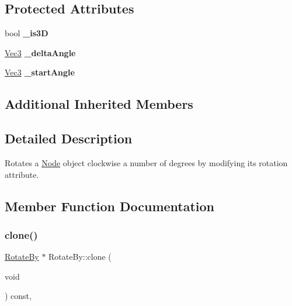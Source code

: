 \subsection*{Protected Attributes}
\begin{DoxyCompactItemize}
\item 
\mbox{\label{classRotateBy_a264eb81fa1ff635803a00cbc2e30b235}} 
bool {\bfseries \+\_\+is3D}
\item 
\mbox{\label{classRotateBy_ac7cebf3ea0439b76ed58d7cd8ddbe96e}} 
\hyperlink{classVec3}{Vec3} {\bfseries \+\_\+delta\+Angle}
\item 
\mbox{\label{classRotateBy_a53cd84a8a3128958b67362ec7919662b}} 
\hyperlink{classVec3}{Vec3} {\bfseries \+\_\+start\+Angle}
\end{DoxyCompactItemize}
\subsection*{Additional Inherited Members}


\subsection{Detailed Description}
Rotates a \hyperlink{classNode}{Node} object clockwise a number of degrees by modifying it\textquotesingle{}s rotation attribute. 

\subsection{Member Function Documentation}
\mbox{\label{classRotateBy_a357bd8a66b4d47a8be520d49a35e5a29}} 
\subsubsection{\texorpdfstring{clone()}{clone()}\hspace{0.1cm}{\footnotesize\ttfamily [1/2]}}
{\footnotesize\ttfamily \hyperlink{classRotateBy}{Rotate\+By} $\ast$ Rotate\+By\+::clone (\begin{DoxyParamCaption}\item[{void}]{ }\end{DoxyParamCaption}) const\hspace{0.3cm}{\ttfamily [override]}, {\ttfamily [virtual]}}

